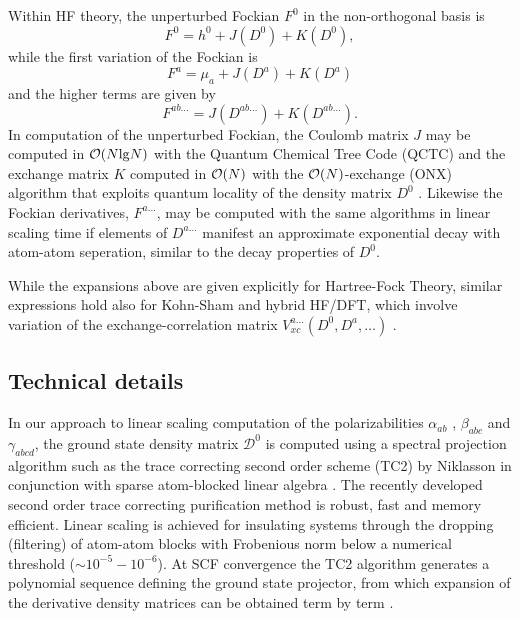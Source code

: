 \documentclass[prl,aps,letterpaper,twocolumn,showpacs,twocolumngrid,superbib]{revtex4}
\begin{document}
Within HF theory, the unperturbed Fockian $F^0$ in the non-orthogonal basis is 
\begin{equation}
F^0=h^0+J(D^0)+K(D^0), \label{fockian0}
\end{equation}
while the first variation of the Fockian is 
\begin{equation}
F^a=\mu_a+J(D^a)+K(D^a)
\end{equation}
and the higher terms are given by 
\begin{equation}
F^{ab\ldots}=J(D^{ab\ldots})+K(D^{ab\ldots}). \label{fockianN}
\end{equation}
In computation of the unperturbed Fockian, the Coulomb matrix $J$ may be computed in ${\cal O}(N{\rm lg}N)$ 
with the Quantum Chemical Tree Code (QCTC) \cite{MChallacombe97} and the
exchange matrix $K$ computed in ${\cal O}(N)$ with the ${\cal O}(N)$-exchange  (ONX) algorithm 
that exploits quantum locality of the density matrix $D^0$ \cite{ESchwegler97}.
Likewise the Fockian derivatives, $F^{a\ldots}$, may be computed 
with the same algorithms in linear scaling time if elements of 
$D^{a\ldots}$ manifest an approximate exponential decay with atom-atom seperation, 
similar to the decay properties of $D^0$. 

While the expansions above are given explicitly for Hartree-Fock Theory, similar expressions 
hold also for Kohn-Sham and hybrid HF/DFT,  which involve variation of the  exchange-correlation 
matrix $V_{xc}^{a\ldots}(D^0,D^a,\ldots)$ \cite{Lee_1994,PSalek02}.

\subsection{Technical details}

In our approach to linear scaling computation of the polarizabilities 
$\alpha_{ab}$ \cite{Weber04}, $\beta_{abc}$ and $\gamma_{abcd}$, the ground state
density matrix $\mathcal{D}^0$ is computed using a spectral projection algorithm such
as the trace correcting second order scheme (TC2) by Niklasson \cite{ANiklasson02A} in 
conjunction with sparse atom-blocked linear algebra \cite{ANiklasson03,MChallacombe00B}.
The recently developed second order trace correcting purification method is robust,
fast and memory efficient. Linear scaling is achieved for insulating systems through the 
dropping (filtering) of atom-atom blocks with Frobenious norm below a numerical threshold ($\sim 10^{-5}-10^{-6}$).
At SCF convergence the TC2 algorithm generates a polynomial sequence 
defining the ground state projector, from which expansion of the derivative 
density matrices can be obtained term by term \cite{ANiklasson04}.
\end{document}
